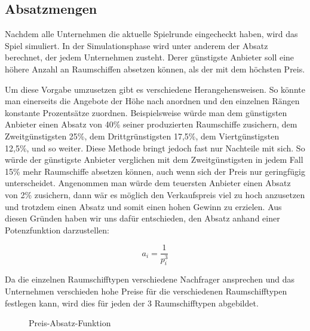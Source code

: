 \subsection{Absatzmengen}
\label{sub:spielwelt-logik-absatzmengen}

Nachdem alle Unternehmen die aktuelle Spielrunde eingecheckt haben, wird das Spiel simuliert. In der Simulationsphase
wird unter anderem der Absatz berechnet, der jedem Unternehmen zusteht. Derer günstigste Anbieter soll eine höhere
Anzahl an Raumschiffen absetzen können, als der mit dem höchsten Preis.

Um diese Vorgabe umzusetzen gibt es verschiedene Herangehensweisen. So könnte man einerseits die Angebote der Höhe nach
anordnen und den einzelnen Rängen konstante Prozentsätze zuordnen. Beispielsweise würde man dem günstigsten Anbieter
einen Absatz von 40\% seiner produzierten Raumschiffe zusichern, dem Zweitgünstigsten 25\%, dem Drittgrünstigsten 17,5\%,
dem Viertgünstigsten 12,5\%, und so weiter. Diese Methode bringt jedoch fast nur Nachteile mit sich. So würde der günstigste
Anbieter verglichen mit dem Zweitgünstigsten in jedem Fall 15\% mehr Raumschiffe absetzen können, auch wenn sich der Preis
nur geringfügig unterscheidet. Angenommen man würde dem teuersten Anbieter einen Absatz von 2\% zusichern, dann wär es möglich
den Verkaufspreis viel zu hoch anzusetzen und trotzdem einen Absatz und somit einen hohen Gewinn zu erzielen. Aus diesen
Gründen haben wir uns dafür entschieden, den Absatz anhand einer Potenzfunktion darzustellen:

\begin{equation}
     a_i = \frac{1}{p_i^3}
     \label{alg:spielwelt-logik-absatzmengen-1}
\end{equation}

Da die einzelnen Raumschifftypen verschiedene Nachfrager ansprechen und das Unternehmen verschieden hohe Preise für die
verschiedenen Raumschifftypen festlegen kann, wird dies für jeden der 3 Raumschifftypen abgebildet.

\begin{figure}[ht]
     \centering
     \caption{Preis-Absatz-Funktion}
     \label{img:spielwelt-logik-absatzmengen-preisabsatzfunktion}
\end{figure}

